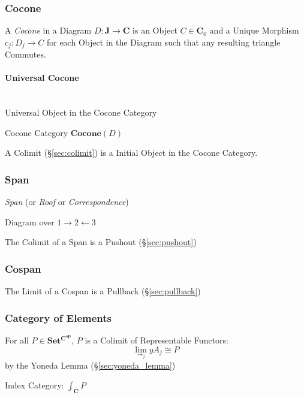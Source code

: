 \subsubsection{Cocone}\label{sec:cocone}

A \emph{Cocone} in a Diagram $D : \mathbf{J} \rightarrow \mathbf{C}$
is an Object $C \in \mathbf{C}_0$ and a Unique Morphism $c_j : D_j
\rightarrow C$ for each Object in the Diagram such that any resulting
triangle Commutes.




\paragraph{Universal Cocone}\label{sec:universal_cocone}
\hfill \\

Universal Object in the Cocone Category

Cocone Category $\mathbf{Cocone}(D)$

A Colimit (\S\ref{sec:colimit}) is a Initial Object in the Cocone
Category.



\subsubsection{Span}\label{sec:span}

\emph{Span} (or \emph{Roof} or \emph{Correspondence})

Diagram over $1 \rightarrow 2 \leftarrow 3$

The Colimit of a Span is a Pushout (\S\ref{sec:pushout})



\subsubsection{Cospan}\label{sec:cospan}

The Limit of a Cospan is a Pullback (\S\ref{sec:pullback})



\subsubsection{Category of Elements}\label{sec:element_category}

For all $P \in \mathbf{Set^{C^{op}}}$, $P$ is a Colimit of
Representable Functors:
\[
  \lim_{\rightarrow_j} yA_j \cong P
\]
by the Yoneda Lemma (\S\ref{sec:yoneda_lemma})

Index Category: $\int_\mathbf{C} P$

